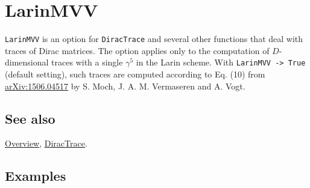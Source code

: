 \documentclass[../FeynCalcManual.tex]{subfiles}
\begin{document}
\hypertarget{larinmvv}{
\section{LarinMVV}\label{larinmvv}}

\texttt{LarinMVV} is an option for \texttt{DiracTrace} and several other
functions that deal with traces of Dirac matrices. The option applies
only to the computation of \(D\)-dimensional traces with a single
\(\gamma ^5\) in the Larin scheme. With \texttt{LarinMVV -> True}
(default setting), such traces are computed according to Eq. (10) from
\href{https://arxiv.org/pdf/1506.04517.pdf}{arXiv:1506.04517} by S.
Moch, J. A. M. Vermaseren and A. Vogt.

\subsection{See also}

\hyperlink{toc}{Overview}, \hyperlink{diractrace}{DiracTrace}.

\subsection{Examples}
\end{document}
